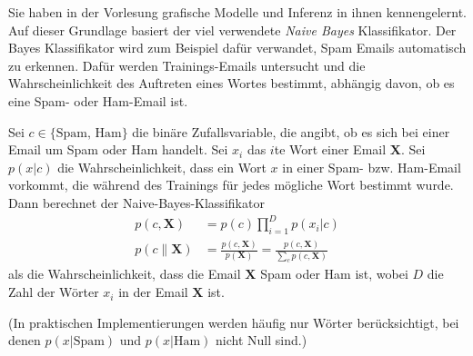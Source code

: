 

\renewcommand{\course}{Artificial Intelligence}
\renewcommand{\coursepicture}{course_ai}
\renewcommand{\coursedate}{Winter 2019}
\renewcommand{\exnum}{Exercise 6}

\exercises
{}
\exercisestitle



Sie haben in der Vorlesung grafische Modelle und Inferenz in ihnen
kennengelernt. Auf dieser Grundlage basiert der viel verwendete \emph{Naive
Bayes} Klassifikator. Der Bayes Klassifikator wird zum Beispiel dafür verwandet,
Spam Emails automatisch zu erkennen. Dafür werden Trainings-Emails untersucht
und die Wahrscheinlichkeit des Auftreten eines Wortes bestimmt, abhängig davon, ob es eine Spam- oder Ham-Email ist.

Sei $c \in \{\text{Spam, Ham}\}$ die binäre Zufallsvariable, die angibt, ob es sich bei einer Email um Spam oder Ham handelt. Sei $x_i$ das $i$te Wort einer Email $\mathbf{X}$. Sei $p(x|c)$ die Wahrscheinlichkeit, dass ein Wort $x$ in einer Spam- bzw. Ham-Email vorkommt, die während des Trainings für jedes mögliche Wort bestimmt wurde. Dann berechnet der Naive-Bayes-Klassifikator
\begin{align*}
  p(c, \mathbf{X}) &= p(c) \prod_{i=1}^{D} p(x_i | c) \\
  p(c \| \mathbf{X}) &= \frac{p(c, \mathbf{X})}{p(\mathbf{X})}
  = \frac{p(c, \mathbf{X})}{\sum_c p(c,\mathbf{X})}
\end{align*}
als die Wahrscheinlichkeit, dass die Email $\mathbf{X}$ Spam oder Ham ist, wobei $D$ die Zahl der Wörter $x_i$ in der Email $\mathbf{X}$ ist.

(In praktischen Implementierungen werden häufig nur Wörter
berücksichtigt, bei denen $p(x|\text{Spam})$ und $p(x|\text{Ham})$
nicht Null sind.)



